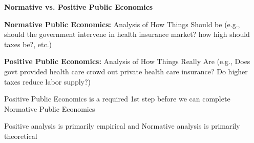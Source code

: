 \documentclass[landscape]{slides}
\begin{document}
\begin{slide}
\begin{center}
{\bf Normative vs. Positive Public Economics}
\end{center}

{\bf Normative Public Economics:} Analysis of How Things Should be
(e.g., should the government intervene in health insurance market?
how high should taxes be?, etc.)

{\bf Positive Public Economics:} Analysis of How Things Really Are
(e.g., Does govt provided health care crowd out private health
care insurance? Do higher taxes reduce labor supply?)

Positive Public Economics is a required 1st step before we can
complete Normative Public Economics

Positive analysis is primarily empirical and Normative analysis is
primarily theoretical




\end{slide}


%
%
%
%
%
%
%
\end{document}
